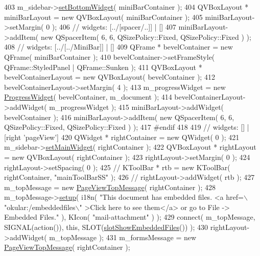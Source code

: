 \begin{DoxyCode}
{403     m\_sidebar->\hyperlink{classSidebar_a4d2956c76781bec3fdffda29b699a75e}{setBottomWidget}( miniBarContainer );
404     QVBoxLayout * miniBarLayout = \textcolor{keyword}{new} QVBoxLayout( miniBarContainer );
405     miniBarLayout->setMargin( 0 );
406     \textcolor{comment}{// widgets: [../[spacer/..]] | []}
407     miniBarLayout->addItem( \textcolor{keyword}{new} QSpacerItem( 6, 6, QSizePolicy::Fixed, QSizePolicy::Fixed ) );
408     \textcolor{comment}{// widgets: [../[../MiniBar]] | []}
409     QFrame * bevelContainer = \textcolor{keyword}{new} QFrame( miniBarContainer );
410     bevelContainer->setFrameStyle( QFrame::StyledPanel | QFrame::Sunken );
411     QVBoxLayout * bevelContainerLayout = \textcolor{keyword}{new} QVBoxLayout( bevelContainer );
412     bevelContainerLayout->setMargin( 4 );
413     m\_progressWidget = \textcolor{keyword}{new} \hyperlink{classProgressWidget}{ProgressWidget}( bevelContainer, m\_document );
414     bevelContainerLayout->addWidget( m\_progressWidget );
415     miniBarLayout->addWidget( bevelContainer );
416     miniBarLayout->addItem( \textcolor{keyword}{new} QSpacerItem( 6, 6, QSizePolicy::Fixed, QSizePolicy::Fixed ) );
417 \textcolor{preprocessor}{#endif}
418 
419     \textcolor{comment}{// widgets: [] | [right 'pageView']}
420     QWidget * rightContainer = \textcolor{keyword}{new} QWidget( 0 );
421     m\_sidebar->\hyperlink{classSidebar_a33bb2672e2e75d2997ea116bd25feea2}{setMainWidget}( rightContainer );
422     QVBoxLayout * rightLayout = \textcolor{keyword}{new} QVBoxLayout( rightContainer );
423     rightLayout->setMargin( 0 );
424     rightLayout->setSpacing( 0 );
425     \textcolor{comment}{//  KToolBar * rtb = new KToolBar( rightContainer, "mainToolBarSS" );}
426     \textcolor{comment}{//  rightLayout->addWidget( rtb );}
427     m\_topMessage = \textcolor{keyword}{new} \hyperlink{classPageViewTopMessage}{PageViewTopMessage}( rightContainer );
428     m\_topMessage->\hyperlink{classPageViewTopMessage_a1027efb398d2d35a82846c0c92e4d257}{setup}( i18n( \textcolor{stringliteral}{"This document has embedded files. <a href=\(\backslash\)"okular:/embeddedfiles\(\backslash\)"
      >Click here to see them</a> or go to File -> Embedded Files."} ), KIcon( \textcolor{stringliteral}{"mail-attachment"} ) );
429     connect( m\_topMessage, SIGNAL(action()), \textcolor{keyword}{this}, SLOT(\hyperlink{classOkular_1_1Part_ae3507834103024f1d02e63d705892a2e}{slotShowEmbeddedFiles}()) );
430     rightLayout->addWidget( m\_topMessage );
431     m\_formsMessage = \textcolor{keyword}{new} \hyperlink{classPageViewTopMessage}{PageViewTopMessage}( rightContainer );
}
\end{DoxyCode}
